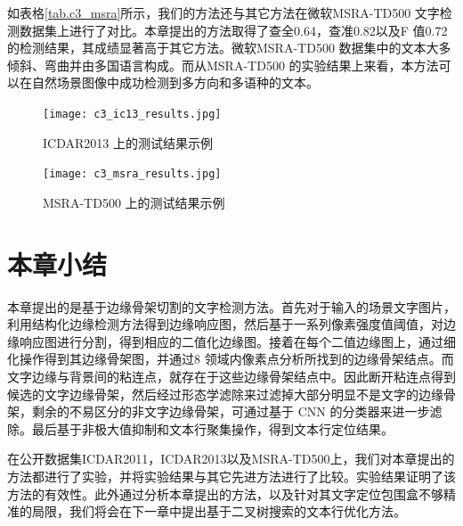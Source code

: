         如表格\ref{tab.c3_msra}所示，我们的方法还与其它方法在微软MSRA-TD500 文字检测数据集上进行了对比。本章提出的方法取得了查全0.64，查准0.82以及F 值0.72的检测结果，其成绩显著高于其它方法。微软MSRA-TD500 数据集中的文本大多倾斜、弯曲并由多国语言构成。而从MSRA-TD500 的实验结果上来看，本方法可以在自然场景图像中成功检测到多方向和多语种的文本。

        \begin{figure}[!h]
        \centering
        \texttt{[image: c3\_ic13\_results.jpg]}
        \caption{ICDAR2013 上的测试结果示例}
        \label{fig.c3_ic13_results}
        \end{figure}

        \begin{figure}[!h]
        \centering
        \texttt{[image: c3\_msra\_results.jpg]}
        \caption{MSRA-TD500 上的测试结果示例}
        \label{fig.c3_msra_results}
        \end{figure}

    \section{本章小结}

    本章提出的是基于边缘骨架切割的文字检测方法。首先对于输入的场景文字图片，利用结构化边缘检测方法得到边缘响应图，然后基于一系列像素强度值阈值，对边缘响应图进行分割，得到相应的二值化边缘图。接着在每个二值边缘图上，通过细化操作得到其边缘骨架图，并通过8 领域内像素点分析所找到的边缘骨架结点。而文字边缘与背景间的粘连点，就存在于这些边缘骨架结点中。因此断开粘连点得到候选的文字边缘骨架，然后经过形态学滤除来过滤掉大部分明显不是文字的边缘骨架，剩余的不易区分的非文字边缘骨架，可通过基于 CNN 的分类器来进一步滤除。最后基于非极大值抑制和文本行聚集操作，得到文本行定位结果。

    在公开数据集ICDAR2011，ICDAR2013以及MSRA-TD500上，我们对本章提出的方法都进行了实验，并将实验结果与其它先进方法进行了比较。实验结果证明了该方法的有效性。此外通过分析本章提出的方法，以及针对其文字定位包围盒不够精准的局限，我们将会在下一章中提出基于二叉树搜索的文本行优化方法。


